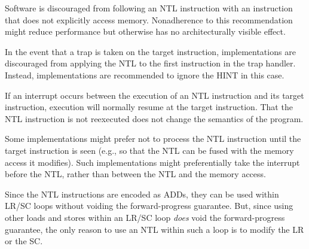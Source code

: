 Software is discouraged from following an NTL instruction with an
instruction that does not explicitly access memory.
Nonadherence to this recommendation might reduce performance but
otherwise has no architecturally visible effect.

In the event that a trap is taken on the target instruction,
implementations are discouraged from applying the NTL to the first instruction
in the trap handler.
Instead, implementations are recommended to ignore the HINT in this case.

\begin{commentary}
If an interrupt occurs between the execution of an NTL instruction and its
target instruction, execution will normally resume at the
target instruction.
That the NTL instruction is not reexecuted does not change the semantics of
the program.

Some implementations might prefer not to process the NTL instruction until the
target instruction is seen (e.g., so that the NTL can be
fused with the memory access it modifies).
Such implementations might preferentially take the interrupt before the NTL,
rather than between the NTL and the memory access.
\end{commentary}

\begin{commentary}
Since the NTL instructions are encoded as ADDs, they can be used within LR/SC
loops without voiding the forward-progress guarantee.
But, since using other loads and stores within an LR/SC loop {\em does}
void the forward-progress guarantee, the only reason to use an NTL
within such a loop is to modify the LR or the SC.
\end{commentary}
